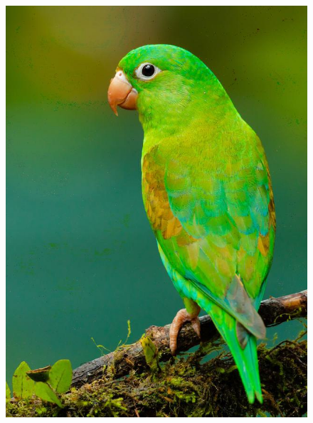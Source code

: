 \begin{figure}[ht]
\begin{minipage}[c]{0.33\linewidth}
    \includegraphics[width=1.\linewidth]{images/hpcom/parrot3_rx.jpg}
  \end{minipage}
  \begin{minipage}[c]{0.33\linewidth}
    \centering

\end{minipage}
\end{figure}
